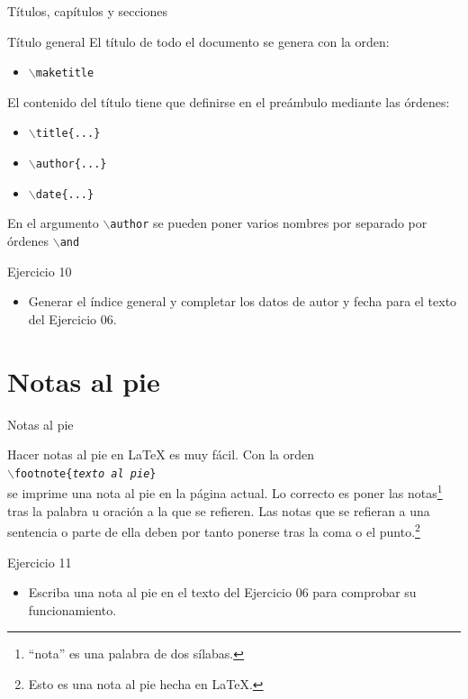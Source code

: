 \documentclass[10pt]{beamer}
\begin{document}
\begin{frame}{Títulos, capítulos y secciones}
\begin{block}{Título general}
El título de todo el documento se genera con la orden:
\begin{itemize}
\item  \texttt{$\backslash$maketitle}
\end{itemize}
El contenido del título tiene que definirse en el preámbulo mediante las órdenes:
\begin{itemize}
\item \texttt{$\backslash$title\{...\}}
\item \texttt{$\backslash$author\{...\}}
\item \texttt{$\backslash$date\{...\}}
\end{itemize}

En el argumento \texttt{$\backslash$author} se pueden poner varios nombres por separado por órdenes \texttt{$\backslash$and}
\end{block}

\begin{exampleblock}{Ejercicio 10}
\begin{itemize}
\item Generar el índice general y completar los datos de autor y fecha para el texto del Ejercicio 06.
\end{itemize}
\end{exampleblock}
\end{frame}

\section{Notas al pie}

\begin{frame}{Notas al pie}
\begin{block}{Hacer notas al pie en \LaTeX{} es muy fácil.}
Con la orden \\
\texttt{$\backslash$footnote\{\emph{texto al pie}\}} \\
se imprime una nota al pie en la página actual. Lo correcto es poner las notas\footnote{“nota” es una palabra de dos sílabas.} tras la palabra u oración a la que se refieren. Las notas que se refieran a una sentencia o parte de ella deben por tanto ponerse tras la coma o el punto.\footnote{Esto es una nota al pie hecha en \LaTeX{}.}
\end{block}

\begin{exampleblock}{Ejercicio 11}
\begin{itemize}
\item Escriba una nota al pie en el texto del Ejercicio 06 para comprobar su funcionamiento.
\end{itemize}
\end{exampleblock}
\end{frame}
\end{document}

